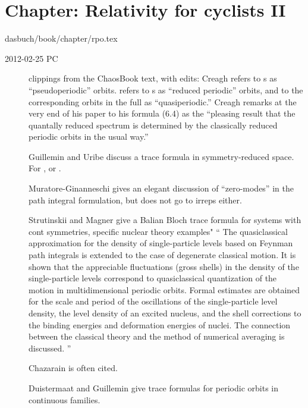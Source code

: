 \section{Chapter: Relativity for cyclists II}
\label{c-rpo}\noindent dasbuch/book/chapter/rpo.tex

\begin{description}
\item[2012-02-25 PC] clippings from the ChaosBook text, with edits:             \toCB
Creagh refers to \rpo s as ``pseudoperiodic'' orbits.
  refers to \rpo s as ``reduced periodic'' orbits, and
to the corresponding orbits in the full {\statesp} as ``quasiperiodic.''
Creagh remarks at the very end of his paper to his formula (6.4) as the
``pleasing result that the quantally reduced spectrum is determined by
the classically reduced periodic orbits in the usual way.'' 

Guillemin and Uribe discuss a trace formula in
symmetry-reduced space. For 
, or
.

Muratore-Ginanneschi gives an elegant
discussion of ``zero-modes'' in the path integral formulation, but does
not go to irreps either.

Strutinskii and  Magner give a
Balian Bloch trace formula for systems with cont symmetries,
specific nuclear theory examples" ``
The quasiclassical approximation for the density of single-particle
levels based on {Feynman} path integrals is extended to the case of
degenerate classical motion. It is shown that the appreciable
fluctuations (gross shells) in the density of the single-particle levels
correspond to quasiclassical quantization of the motion in
multidimensional periodic orbits. Formal estimates are obtained for the
scale and period of the oscillations of the single-particle level
density, the level density of an excited nucleus, and the shell
corrections to the binding energies and deformation energies of nuclei.
The connection between the classical theory and the method of numerical
averaging is discussed.
''

Chazarain is often cited.


Duistermaat and Guillemin give
trace formulas for periodic orbits in continuous families.


\end{description}

